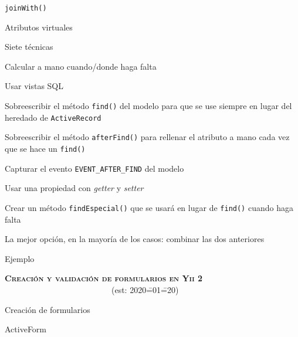 \begin{longenum}
\begin{longenum}
\begin{longenum}
\begin{longenum}
            \end{longenum}
            \item \texttt{joinWith()}
            \item Atributos virtuales
            \begin{longenum}
                \item Siete técnicas
                \begin{longenum}
                    \item Calcular a mano cuando/donde haga falta
                    \item Usar vistas SQL
                    \item Sobreescribir el método \texttt{find()} del modelo para que se use siempre en lugar del heredado de \texttt{ActiveRecord}
                    \item Sobreescribir el método \texttt{afterFind()} para rellenar el atributo a mano cada vez que se hace un \texttt{find()}
                    \item Capturar el evento \texttt{EVENT\_AFTER\_FIND} del modelo
                    \item Usar una propiedad con \textit{getter} y \textit{setter}
                    \item Crear un método \texttt{findEspecial()} que se usará en lugar de \texttt{find()} cuando haga falta
                    \item La mejor opción, en la mayoría de los casos: combinar las dos anteriores
                    \begin{longenum}
                        \item Ejemplo
                    \end{longenum}
                \end{longenum}
            \end{longenum}
        \end{longenum}
    \end{longenum}
    \item \textbf{\textsc{Creación y validación de formularios en Yii 2}} \ \ \ \ \ \ \ \ \ \ \ \ \ \ \ \ \ \ \ \ \ \ \ \ \ \ (est: 2020\==01\==20)
    \begin{longenum}
        \item Creación de formularios
        \begin{longenum}
            \item ActiveForm

\end{longenum}
\end{longenum}
\end{longenum}
